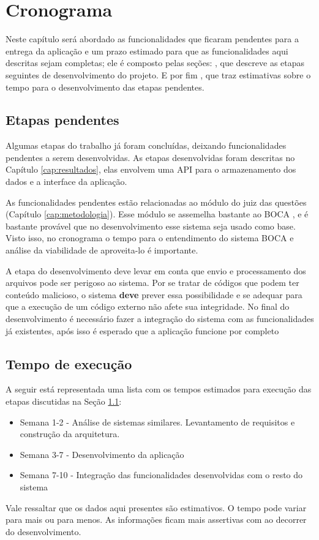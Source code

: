\chapter[Cronograma]{Cronograma}
\label{chap:cronograma}

Neste capítulo será abordado as funcionalidades que ficaram pendentes para a entrega da aplicação e um prazo estimado para que as funcionalidades aqui descritas sejam completas; ele é composto pelas seções:
, que descreve as etapas seguintes de desenvolvimento do projeto.
E por fim , que traz estimativas sobre o tempo para o desenvolvimento das etapas pendentes.

\section{Etapas pendentes}
\label{sec:etapasPendentes}

Algumas etapas do trabalho já foram concluídas, deixando funcionalidades pendentes a serem desenvolvidas. As etapas desenvolvidas foram descritas no Capítulo \ref{cap:resultados}, elas envolvem uma API para o armazenamento dos dados e a interface da aplicação.

As funcionalidades pendentes estão relacionadas ao módulo do juiz das questões (Capítulo \ref{cap:metodologia}). Esse módulo se assemelha bastante ao BOCA \cite{de2004boca}, e é bastante provável que no desenvolvimento esse sistema seja usado como base. Visto isso, no cronograma o tempo para o entendimento do sistema BOCA e análise da viabilidade de aproveita-lo é importante.

A etapa do desenvolvimento deve levar em conta que envio e processamento dos arquivos pode ser perigoso ao sistema. Por se tratar de códigos que podem ter conteúdo malicioso, o sistema \textbf{deve} prever essa possibilidade e se adequar para que a execução de um código externo não afete sua integridade. No final do desenvolvimento é necessário fazer a integração do sistema com as funcionalidades já existentes, após isso é esperado que a aplicação funcione por completo

\section{Tempo de execução}
\label{sec:tempoDeExecucao}

A seguir está representada uma lista com os tempos estimados para execução das etapas discutidas na Seção \ref{sec:etapasPendentes}:

\begin{itemize}
    \item Semana 1-2 - Análise de sistemas similares. Levantamento de requisitos e construção da arquitetura.
    \item Semana 3-7 - Desenvolvimento da aplicação 
    \item Semana 7-10 - Integração das funcionalidades desenvolvidas com o resto do sistema
\end{itemize}

Vale ressaltar que os dados aqui presentes são estimativos. O tempo pode variar para mais ou para menos. As informações ficam mais assertivas com ao decorrer do desenvolvimento.